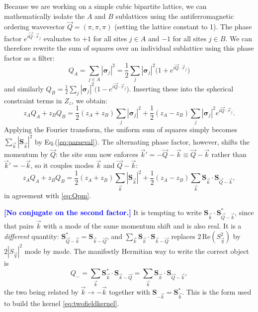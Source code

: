 \documentclass[11pt,a4paper]{article}
\newcommand{\bk}{\vec k}
\newcommand{\bQ}{\vec Q}
\newcommand{\bq}{\vec q}
\newcommand{\FLAG}[1]{\textcolor{blue}{\textbf{[#1]}}}
\newcommand{\bk}{\vec k}
\newcommand{\bQ}{\vec Q}
\newcommand{\bq}{\vec q}
\newcommand{\FLAG}[1]{\textcolor{blue}{\textbf{[#1]}}}
\begin{document}
Because we are working on a simple cubic bipartite lattice, we can mathematically isolate the $A$ and $B$ sublattices using the antiferromagnetic ordering wavevector $\bQ = (\pi, \pi, \pi)$ (setting the lattice constant to 1). The phase factor $e^{i \bQ \cdot \vec r_j}$ evaluates to $+1$ for all sites $j \in A$ and $-1$ for all sites $j \in B$. 
We can therefore rewrite the sum of squares over an individual sublattice using this phase factor as a filter:
\begin{equation}
  Q_A = \sum_{j \in A} |\bm{\sigma}_j|^2 = \frac{1}{2} \sum_j |\bm{\sigma}_j|^2 \big(1 + e^{i \bQ \cdot \vec r_j}\big)
\end{equation}
and similarly $Q_B = \frac{1}{2} \sum_j |\bm{\sigma}_j|^2 \big(1 - e^{i \bQ \cdot \vec r_j}\big)$. 
Inserting these into the spherical constraint terms in $Z_z$, we obtain:
\begin{equation}
  z_A Q_A + z_B Q_B = \frac{1}{2}(z_A + z_B) \sum_j |\bm{\sigma}_j|^2 + \frac{1}{2}(z_A - z_B) \sum_j |\bm{\sigma}_j|^2 e^{i \bQ \cdot \vec r_j}.
\end{equation}
Applying the Fourier transform, the uniform sum of squares simply becomes
$\sum_{\bk}|\bm S_{\bk}|^2$ by Eq.(\ref{eq:parseval}). The alternating phase factor, however,
shifts the momentum by $\bQ$: the site sum now enforces $\bk'=-\bQ-\bk\equiv\bQ-\bk$ rather
than $\bk'=-\bk$, so it couples modes $\bk$ and $\bQ-\bk$:
\begin{equation}
  z_A Q_A + z_B Q_B = \frac{1}{2}(z_A + z_B) \sum_{\bk} |\bm{S}_{\bk}|^2
   + \frac{1}{2}(z_A - z_B) \sum_{\bk} \bm{S}_{\bk} \cdot \bm{S}_{\bQ-\bk},
\end{equation}
in agreement with \eqref{eq:Qpm}.

\FLAG{No conjugate on the second factor.} It is tempting to write
$\bm S_{\bk}\cdot\bm S^{*}_{\bQ-\bk}$, since that pairs $\bk$ with a mode of the same
momentum shift and is also real. It is a \emph{different} quantity:
$\bm S^{*}_{\bQ-\bk}=\bm S_{\bk-\bQ}$, and $\sum_{\bk}\bm S_{\bk}\cdot\bm S_{\bk-\bQ}$
replaces $2\,\mathrm{Re}(S_{\bq}^2)$ by $2|S_{\bq}|^2$ mode by mode. The manifestly
Hermitian way to write the correct object is
\begin{equation}
  Q_-=\sum_{\bk}\bm S^{*}_{\bk}\cdot\bm S_{\bk-\bQ}
     =\sum_{\bk}\bm S_{\bk}\cdot\bm S_{\bQ-\bk},
\end{equation}
the two being related by $\bk\to-\bk$ together with $\bm S_{-\bk}=\bm S^{*}_{\bk}$. This is
the form used to build the kernel \eqref{eq:twofieldkernel}.
\end{document}
